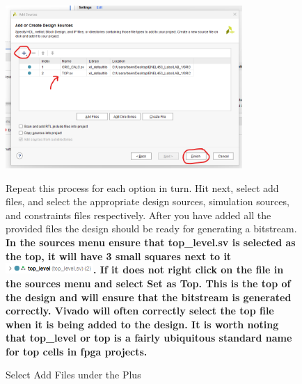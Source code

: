     \begin{figure}[H]
        \centering
        \includegraphics[width=9cm]{Images/CreateBitstreamImages/Vivado_AddSources_Page2.png}
        \caption{Select Add Files under the Plus}
        \label{fig:enter-label}
        \raggedright
        \vspace{0.5cm}
        Repeat this process for each option in turn. Hit next, select add files, and select the appropriate design sources, simulation sources, and constraints files respectively. After you have added all the provided files the design should be ready for generating a bitstream. \textbf{In the sources menu ensure that top\_level.sv is selected as the top, it will have 3 small squares next to it \includegraphics[height=4mm]{Images/CreateProjectImages/top_level_3Dots.png}. If it does not right click on the file in the sources menu and select Set as Top. This is the top of the design and will ensure that the bitstream is generated correctly. Vivado will often correctly select the top file when it is being added to the design. It is worth noting that top\_level or top is a fairly ubiquitous standard name for top cells in fpga projects.}
    \end{figure}

    
\else
\fi




